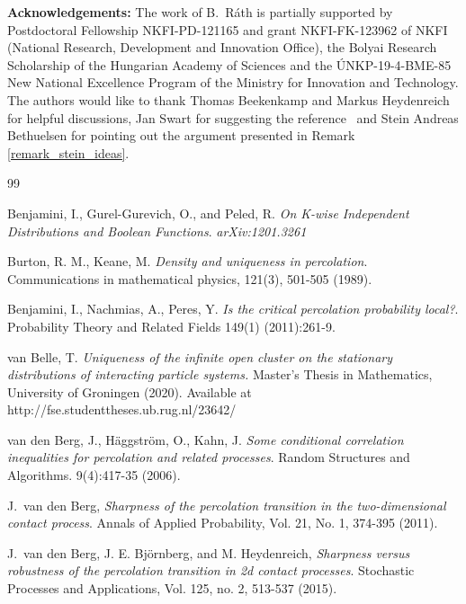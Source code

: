 \documentclass[a4paper,12pt]{article}
\begin{document}
 {\bf Acknowledgements:}
 The work of B.~R\'ath is partially supported by
Postdoctoral Fellowship NKFI-PD-121165 and grant NKFI-FK-123962 of NKFI
(National Research, Development and Innovation Office), the Bolyai Research
Scholarship of the Hungarian Academy of Sciences and the \'UNKP-19-4-BME-85
New National Excellence Program of the Ministry for Innovation and Technology.  The authors would like to thank Thomas Beekenkamp and Markus Heydenreich for helpful discussions, Jan Swart for suggesting the reference~\cite{SV86} and Stein Andreas Bethuelsen for pointing out the argument presented in Remark \ref{remark_stein_ideas}.






{\footnotesize
\begin{thebibliography}{99}


Benjamini, I., Gurel-Gurevich, O., and Peled, R.
\textit{On K-wise Independent Distributions and Boolean Functions}.
\emph{arXiv:1201.3261}

 Burton, R. M., Keane, M. \textit{Density and uniqueness in percolation}. Communications in mathematical physics, 121(3), 501-505 (1989).

	Benjamini, I., Nachmias, A., Peres, Y. \textit{Is the critical percolation probability local?}. Probability Theory and Related Fields 149(1) (2011):261-9.

 van Belle, T.  \textit{Uniqueness of the infinite open cluster on the
	stationary distributions of interacting particle systems.} Master's Thesis in Mathematics, University of Groningen (2020). Available at http://fse.studenttheses.ub.rug.nl/23642/

 van den Berg, J., H\"aggstr\"om, O., Kahn, J. \textit{Some conditional correlation inequalities for percolation and related processes}. Random Structures and Algorithms. 9(4):417-35 (2006).

 J.\ van den Berg,
\textit{Sharpness of the percolation transition in the two-dimensional contact process}.
Annals of Applied Probability, Vol. 21, No. 1, 374-395 (2011).

J.\ van den Berg, J. E. Bj\"ornberg, and M. Heydenreich,
\textit{Sharpness versus robustness of the percolation transition in 2d contact processes}.
Stochastic Processes and Applications,
Vol. 125, no. 2, 513-537 (2015).



\end{thebibliography}}
\end{document}
